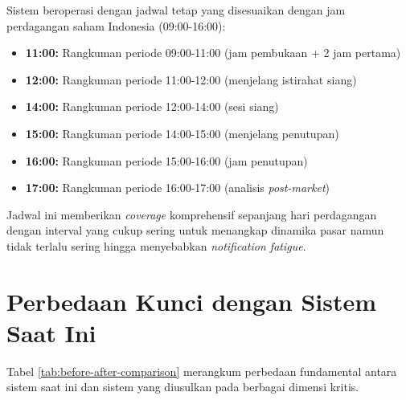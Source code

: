 Sistem beroperasi dengan jadwal tetap yang disesuaikan dengan jam perdagangan saham Indonesia (09:00-16:00):

\begin{itemize}
\item \textbf{11:00:} Rangkuman periode 09:00-11:00 (jam pembukaan + 2 jam pertama)
\item \textbf{12:00:} Rangkuman periode 11:00-12:00 (menjelang istirahat siang)
\item \textbf{14:00:} Rangkuman periode 12:00-14:00 (sesi siang)
\item \textbf{15:00:} Rangkuman periode 14:00-15:00 (menjelang penutupan)
\item \textbf{16:00:} Rangkuman periode 15:00-16:00 (jam penutupan)
\item \textbf{17:00:} Rangkuman periode 16:00-17:00 (analisis \textit{post-market})
\end{itemize}

Jadwal ini memberikan \textit{coverage} komprehensif sepanjang hari perdagangan dengan interval yang cukup sering untuk menangkap dinamika pasar namun tidak terlalu sering hingga menyebabkan \textit{notification fatigue}.

\section{Perbedaan Kunci dengan Sistem Saat Ini}
\label{sec:key-differences}

Tabel \ref{tab:before-after-comparison} merangkum perbedaan fundamental antara sistem saat ini dan sistem yang diusulkan pada berbagai dimensi kritis.

